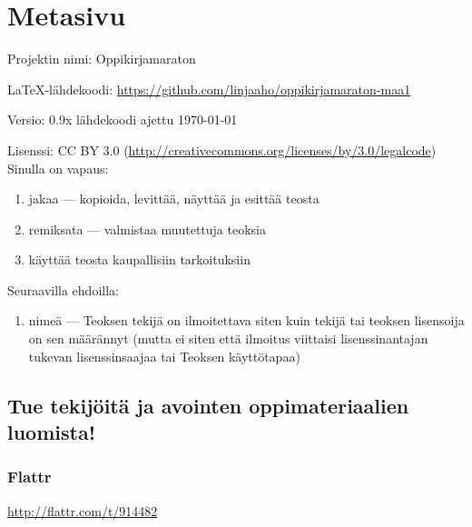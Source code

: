 \newpage

\section*{Metasivu}

Projektin nimi: Oppikirjamaraton

LaTeX-lähdekoodi: \url{https://github.com/linjaaho/oppikirjamaraton-maa1}

Versio: 0.9x \qquad lähdekoodi ajettu \today

Lisenssi: CC BY 3.0 (\url{http://creativecommons.org/licenses/by/3.0/legalcode})\\
Sinulla on vapaus:
\begin{enumerate}
\item jakaa — kopioida, levittää, näyttää ja esittää teosta
\item remiksata — valmistaa muutettuja teoksia
\item käyttää teosta kaupallisiin tarkoituksiin
\end{enumerate}
Seuraavilla ehdoilla:
\begin{enumerate}
\item nimeä — Teoksen tekijä on ilmoitettava siten kuin tekijä tai teoksen lisensoija on sen määrännyt (mutta ei siten että ilmoitus viittaisi lisenssinantajan tukevan lisenssinsaajaa tai Teoksen käyttötapaa)
\end{enumerate}

\subsection*{Tue tekijöitä ja avointen oppimateriaalien luomista!}

\subsubsection*{Flattr}

\url{http://flattr.com/t/914482}

